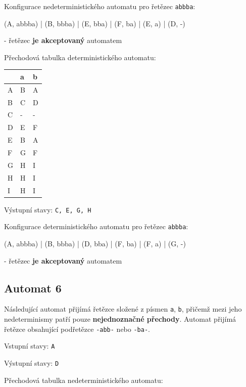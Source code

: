 \documentclass[11pt]{article}
\begin{document}
\bigskip

Konfigurace nedeterministického automatu pro řetězec \texttt{abbba}:

(A, abbba) | (B, bbba) | (E, bba) | (F, ba) | (E, a) | (D, -)

- řetězec \textbf{je akceptovaný} automatem

\bigskip

Přechodová tabulka deterministického automatu:

\bigskip

\begin{tabular}{| l | l | l |}
\hline
  & a & b \\ \hline
A & B & A \\ \hline
B & C & D \\ \hline
C & - & - \\ \hline
D & E & F \\ \hline
E & B & A \\ \hline
F & G & F \\ \hline
G & H & I \\ \hline
H & H & I \\ \hline
I & H & I \\
\hline
\end{tabular}

\bigskip

Výstupní stavy: \texttt{C, E, G, H}

\bigskip

Konfigurace deterministického automatu pro řetězec \texttt{abbba}:

(A, abbba) | (B, bbba) | (D, bba) | (F, ba) | (F, a) | (G, -)

- řetězec \textbf{je akceptovaný} automatem

\newpage

\subsection{Automat 6}
Následující automat přijímá řetězce složené z písmen \texttt{a}, \texttt{b}, přičemž mezi jeho nedeterminismy patří pouze \textbf{nejednoznačné přechody}. Automat přijímá řetězce obsahující podřetězce \texttt{-abb-} nebo \texttt{-ba-}.

\bigskip

Vstupní stavy: \texttt{A}

Výstupní stavy: \texttt{D}

\bigskip

Přechodová tabulka nedeterministického automatu:
\end{document}
